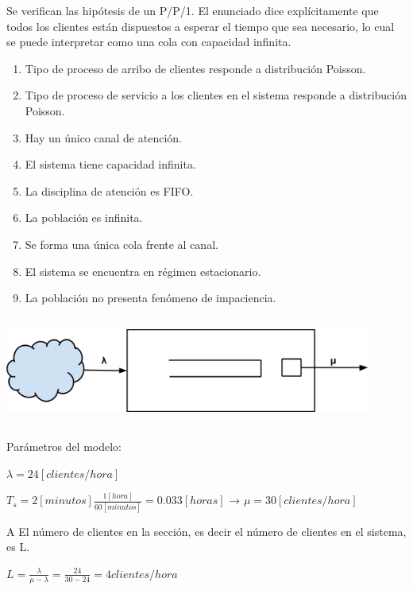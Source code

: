 \documentclass[a4paper,11pt]{article}
\begin{document}
Se verifican las hipótesis de un P/P/1. El enunciado dice explícitamente que 
todos los clientes están dispuestos a esperar el tiempo que sea necesario, lo 
cual se puede interpretar como una cola con capacidad infinita.

\begin{enumerate}[1.]
  \item Tipo de proceso de arribo de clientes responde a distribución Poisson.
  \item Tipo de proceso de servicio a los clientes en el sistema responde a distribución Poisson.
  \item Hay un único canal de atención.
  \item El sistema tiene capacidad infinita.
  \item La disciplina de atención es FIFO.
  \item La población es infinita.
  \item Se forma una única cola frente al canal.
  \item El sistema se encuentra en régimen estacionario.
  \item La población no presenta fenómeno de impaciencia.
\end{enumerate}

\vspace{13pt}
\includegraphics[width=341pt, height=101pt, keepaspectratio=true]{TP1-Colas-fig001.png}

\vspace{27pt}
Parámetros del modelo:

$\lambda = 24 [clientes/hora]$

$T_s = 2 [minutos] \frac{1[hora]}{60[minutos]} = 0.033 [horas]$ → $\mu = 30 [clientes/hora]$

\vspace{13pt}
A  El número de clientes en la sección, es decir el número de clientes en el 
sistema, es L.

$L = \frac{\lambda}{\mu - \lambda} = \frac{24}{30 - 24} = 4 clientes/hora$
\end{document}

